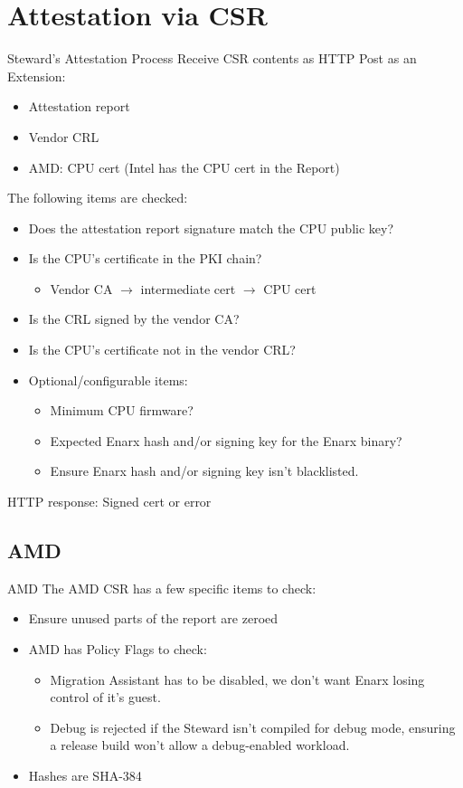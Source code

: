 \documentclass[graphics]{beamer}
\begin{document}
\section{Attestation via CSR}
\begin{frame}{Steward's Attestation Process}
Receive CSR contents as HTTP Post as an Extension:
\begin{itemize}
    \item Attestation report
    \item Vendor CRL
    \item AMD: CPU cert (Intel has the CPU cert in the Report)
\end{itemize}

The following items are checked:
\begin{itemize}
    \item Does the attestation report signature match the CPU public key?
    \item Is the CPU's certificate in the PKI chain?
    \begin{itemize}
        \item Vendor CA $\rightarrow$ intermediate cert $\rightarrow$ CPU cert
    \end{itemize}
    \item Is the CRL signed by the vendor CA?
    \item Is the CPU's certificate not in the vendor CRL?
    \item Optional/configurable items:
    \begin{itemize}
        \item Minimum CPU firmware?
        \item Expected Enarx hash and/or signing key for the Enarx binary?
        \item Ensure Enarx hash and/or signing key isn't blacklisted.
    \end{itemize}
\end{itemize}

HTTP response: Signed cert or error
\end{frame}

\subsection{AMD}
\begin{frame}{AMD}
The AMD CSR has a few specific items to check:
\begin{itemize}
    \item Ensure unused parts of the report are zeroed
    \item AMD has Policy Flags to check:
    \begin{itemize}
        \item Migration Assistant has to be disabled, we don't want Enarx losing control of it's guest.
        \item Debug is rejected if the Steward isn't compiled for debug mode, ensuring a release build won't allow a debug-enabled workload.
    \end{itemize}
    \item Hashes are SHA-384
\end{itemize}
\end{frame}
\end{document}
